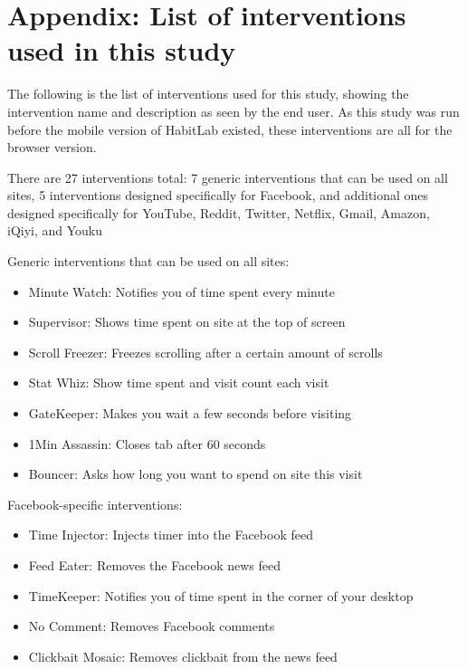 \pagebreak

\section{Appendix: List of interventions used in this study}

The following is the list of interventions used for this study, showing the intervention name and description as seen by the end user. As this study was run before the mobile version of HabitLab existed, these interventions are all for the browser version.

There are 27 interventions total: 7 generic interventions that can be used on all sites, 5 interventions designed specifically for Facebook, and additional ones designed specifically for YouTube, Reddit, Twitter, Netflix, Gmail, Amazon, iQiyi, and Youku

Generic interventions that can be used on all sites:

\begin{itemize}
    \item Minute Watch: Notifies you of time spent every minute
    \item Supervisor: Shows time spent on site at the top of screen
    \item Scroll Freezer: Freezes scrolling after a certain amount of scrolls
    \item Stat Whiz: Show time spent and visit count each visit
    \item GateKeeper: Makes you wait a few seconds before visiting
    \item 1Min Assassin: Closes tab after 60 seconds
    \item Bouncer: Asks how long you want to spend on site this visit
\end{itemize}

\vspace{2mm}

Facebook-specific interventions:

\begin{itemize}
    \item Time Injector: Injects timer into the Facebook feed
    \item Feed Eater: Removes the Facebook news feed
    \item TimeKeeper: Notifies you of time spent in the corner of your desktop
    \item No Comment: Removes Facebook comments
    \item Clickbait Mosaic: Removes clickbait from the news feed
\end{itemize}

